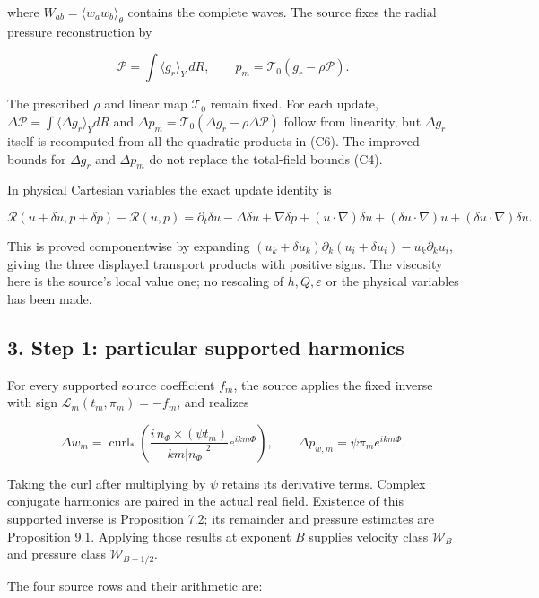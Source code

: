 \documentclass[10pt,a4paper]{article}
\begin{document}
where \(W_{ab}=\langle w_aw_b\rangle_\theta\) contains the complete waves. The source fixes the radial pressure reconstruction by

\[
\mathcal P=\int\langle g_r\rangle_Y\,dR,
\qquad p_m=\mathcal T_0(g_r-\rho\mathcal P).
\tag{C7}
\]

The prescribed \(\rho\) and linear map \(\mathcal T_0\) remain fixed. For each update, \(\Delta\mathcal P=\int\langle\Delta g_r\rangle_YdR\) and \(\Delta p_m=\mathcal T_0(\Delta g_r-\rho\Delta\mathcal P)\) follow from linearity, but \(\Delta g_r\) itself is recomputed from all the quadratic products in (C6). The improved bounds for \(\Delta g_r\) and \(\Delta p_m\) do not replace the total-field bounds (C4).

In physical Cartesian variables the exact update identity is

\[
\mathcal R(u+\delta u,p+\delta p)-\mathcal R(u,p)
=\partial_t\delta u-\Delta\delta u+\nabla\delta p
+(u\cdot\nabla)\delta u+(\delta u\cdot\nabla)u
+(\delta u\cdot\nabla)\delta u.
\tag{C8}
\]

This is proved componentwise by expanding \((u_k+\delta u_k)\partial_k(u_i+\delta u_i)-u_k\partial_ku_i\), giving the three displayed transport products with positive signs. The viscosity here is the source's local value one; no rescaling of \(h,Q,\varepsilon\) or the physical variables has been made.

\subsection{3. Step 1: particular supported harmonics}\label{nsupstream:stage_cycle_gain_audit:step-1-particular-supported-harmonics}

For every supported source coefficient \(f_m\), the source applies the fixed inverse with sign \(\mathcal L_m(t_m,\pi_m)=-f_m\), and realizes

\[
\Delta w_m=\operatorname{curl}_*
\left(\frac{i\,n_\Phi\times(\psi t_m)}{km|n_\Phi|^2}e^{ikm\Phi}\right),
\qquad
\Delta p_{w,m}=\psi\pi_me^{ikm\Phi}.
\tag{C9}
\]

Taking the curl after multiplying by \(\psi\) retains its derivative terms. Complex conjugate harmonics are paired in the actual real field. Existence of this supported inverse is Proposition 7.2; its remainder and pressure estimates are Proposition 9.1. Applying those results at exponent \(B\) supplies velocity class \(\mathcal W_B\) and pressure class \(\mathcal W_{B+1/2}\).

The four source rows and their arithmetic are:
\end{document}
